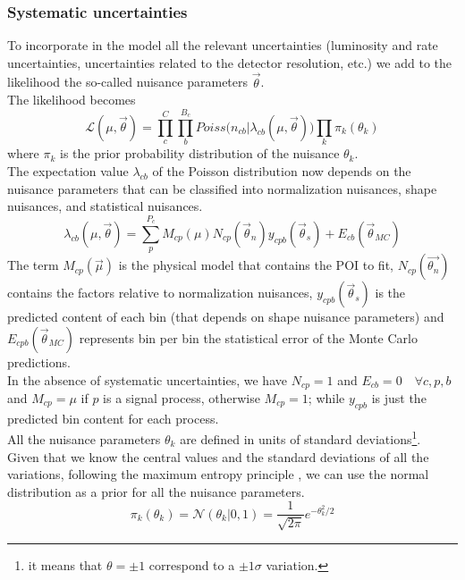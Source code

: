 \subsubsection*{Systematic uncertainties}
To incorporate in the model all the relevant uncertainties (\ie luminosity and rate uncertainties, uncertainties related to the detector resolution, etc.) we add to the likelihood the so-called nuisance parameters $\vec{\theta}$.\\
The likelihood becomes \cite{Conway2011IncorporatingSpectra}
\begin{equation}\label{eq:likelihood}
    \mathcal{L}(\mu,\vec{\theta})=\prod_c^C \prod_b^{B_c} Poiss \big( n_{cb}| \lambda_{cb}(\mu,\vec{\theta}) \big)  \prod_k  \pi_{k}(\theta_k)
\end{equation}
where $\pi_{k}$ is the prior probability distribution of the nuisance $\theta_k$.\\
The expectation value $\lambda_{cb}$ of the Poisson distribution now depends on the nuisance parameters that can be classified into normalization nuisances, shape nuisances, and statistical nuisances.
\begin{equation}\label{eq:lambda}
     \lambda_{cb}( \mu,\vec{\theta})=\sum_p^{P_c}M_{cp}(\mu) N_{cp}(\vec{\theta}_n)y_{cpb}(\vec{\theta}_s)+E_{cb}(\vec{\theta}_{MC})
\end{equation}
The term $M_{cp}(\vec{\mu})$ is the physical model that contains the POI to fit, $N_{cp}(\vec{\theta_n})$ contains the factors relative to normalization nuisances, $y_{cpb}(\vec{\theta}_s)$ is the predicted content of each bin (that depends on shape nuisance parameters) and $E_{cpb}(\vec{\theta}_{MC})$ represents bin per bin the statistical error of the Monte Carlo predictions.\\
In the absence of systematic uncertainties, we have $N_{cp}=1$ and $E_{cb}=0 \quad \forall c,p,b$ and
$M_{cp}=\mu$ if $p$ is a signal process, otherwise $M_{cp}=1$; while $y_{cpb}$ is just the predicted bin content for each process.\\
All the nuisance parameters $\theta_k$ are defined in units of standard deviations\footnote{it means that $\theta=\pm 1$ correspond to a $\pm 1 \sigma$ variation.}.\\
Given that we know the central values and the standard deviations of all the variations, following the maximum entropy principle \cite{Jaynes2003ProbabilityScience}, we can use the normal distribution as a prior for all the nuisance parameters.
\begin{equation}
    \pi_k(\theta_k)=\mathcal{N}\left(\theta_k|0,1\right)=\frac{1}{\sqrt{2\pi}}e^{-\theta_k^2/2}
\end{equation}
